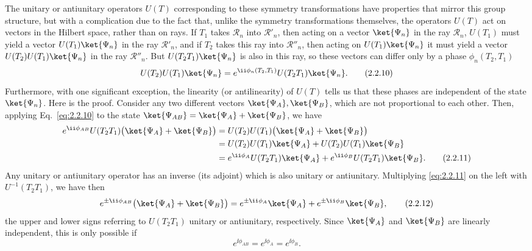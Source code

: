 The unitary or antiunitary operators $U(T)$ corresponding to these
symmetry transformations have properties that mirror this group structure,
but with a complication due to the fact that, unlike the symmetry
transformations themselves, the operators $U(T)$ act on vectors in the
Hilbert space, rather than on rays. If $T_1$ takes $\mathcal{R}_n$ into
$\mathcal{R}'_n$, then acting on a vector $\ket{\Psi_n}$ in the ray
$\mathcal{R}_n$, $U(T_1)$ must yield a vector $U(T_1)\ket{\Psi_n}$ in the
ray $\mathcal{R}'_n$, and if $T_2$ takes this ray into $\mathcal{R}''_n$,
then acting on $U(T_1)\ket{\Psi_n}$ it must yield a vector
$U(T_2)U(T_1)\ket{\Psi_n}$ in the ray $\mathcal{R}''_n$. But
$U(T_2T_1)\ket{\Psi_n}$ is also in this ray, so these vectors can differ
only by a phase $\phi_n(T_2,T_1)$
\begin{equation}
  U(T_2)U(T_1)\ket{\Psi_n}
    =e^{\ii\phi_n(T_2,T_1)}U(T_2T_1)\ket{\Psi_n}.
  \tag{2.2.10}\label{eq:2.2.10}
\end{equation}
Furthermore, with one significant exception, the linearity (or
antilinearity) of $U(T)$ tells us that these phases are independent of the
state $\ket{\Psi_n}$. Here is the proof. Consider any two different vectors
$\ket{\Psi_A},\ket{\Psi_B}$, which are not proportional to each other.
Then, applying Eq.~\eqref{eq:2.2.10} to the state
$\ket{\Psi_{AB}}=\ket{\Psi_A}+\ket{\Psi_B}$, we have
\begin{align}
  e^{\ii\phi_{AB}}U(T_2T_1)
    \bigl(\ket{\Psi_A}+\ket{\Psi_B}\bigr)
  &=U(T_2)U(T_1)\bigl(\ket{\Psi_A}+\ket{\Psi_B}\bigr)\notag\\
  &=U(T_2)U(T_1)\ket{\Psi_A}
    +U(T_2)U(T_1)\ket{\Psi_B}\notag\\
  &=e^{\ii\phi_A}U(T_2T_1)\ket{\Psi_A}
    +e^{\ii\phi_B}U(T_2T_1)\ket{\Psi_B}.
  \tag{2.2.11}\label{eq:2.2.11}
\end{align}
Any unitary or antiunitary operator has an inverse (its adjoint) which
is also unitary or antiunitary. Multiplying \eqref{eq:2.2.11} on the left with
$U^{-1}(T_2T_1)$, we have then
\begin{equation}
  e^{\pm \ii\phi_{AB}}\bigl(\ket{\Psi_A}+\ket{\Psi_B}\bigr)
    =e^{\pm \ii\phi_A}\ket{\Psi_A}
      +e^{\pm \ii\phi_B}\ket{\Psi_B},
  \tag{2.2.12}\label{eq:2.2.12}
\end{equation}
the upper and lower signs referring to $U(T_2T_1)$ unitary or antiunitary,
respectively. Since $\ket{\Psi_A}$ and $\ket{\Psi_B}$ are linearly
independent, this is only possible if
\begin{equation}
  e^{\ii\phi_{AB}}=e^{\ii\phi_A}=e^{\ii\phi_B}.
  \tag{2.2.13}\label{eq:2.2.13}
\end{equation}
